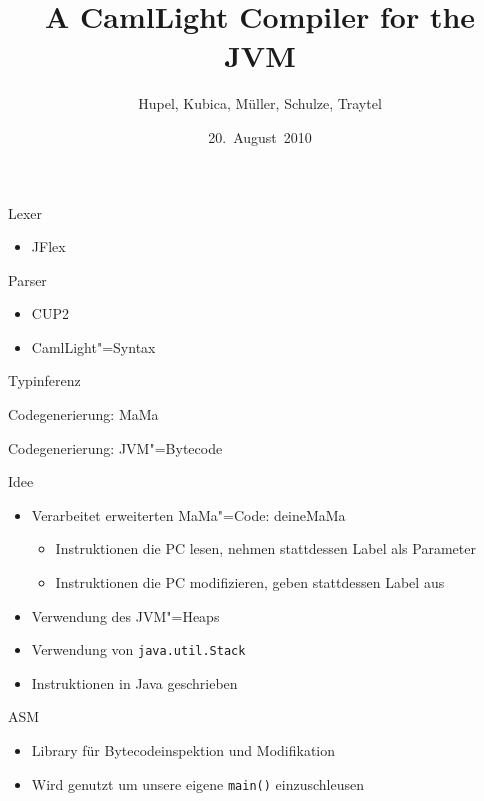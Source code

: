 \documentclass[hyperref={pdfpagelabels=false}]{beamer}
\title{A CamlLight Compiler for the JVM}
\author{Hupel, Kubica, Müller, Schulze, Traytel}
\institute{TU München}
\date{20.~August~2010}
\begin{document}
\frame{\titlepage}


\begin{frame}{Lexer}
  \begin{itemize}
    \item JFlex
  \end{itemize}
\end{frame}

\begin{frame}{Parser}
  \begin{itemize}
    \item CUP2
    \item CamlLight"=Syntax
  \end{itemize}
\end{frame}

\begin{frame}{Typinferenz}
\end{frame}

\begin{frame}{Codegenerierung: MaMa}
\end{frame}

\begin{frame}{Codegenerierung: JVM"=Bytecode}
  \begin{block}{Idee}
    \begin{itemize}
      \item Verarbeitet erweiterten MaMa"=Code: deineMaMa
        \begin{itemize}
          \item Instruktionen die PC lesen, nehmen stattdessen Label als Parameter
          \item Instruktionen die PC modifizieren, geben stattdessen Label aus
        \end{itemize}
      \item Verwendung des JVM"=Heaps
      \item Verwendung von \texttt{java.util.Stack}
      \item Instruktionen in Java geschrieben
    \end{itemize}
  \end{block}
  \begin{block}{ASM}
    \begin{itemize}
      \item Library für Bytecodeinspektion und Modifikation
      \item Wird genutzt um unsere eigene \texttt{main()} einzuschleusen
    \end{itemize}
  \end{block}
\end{frame}
\end{document}
